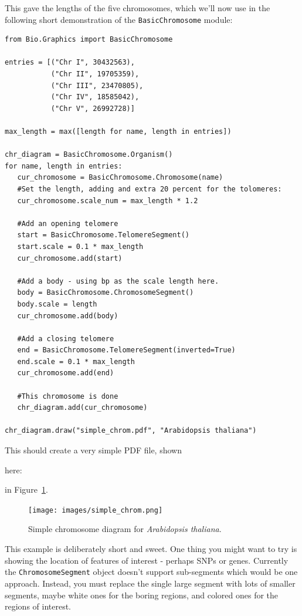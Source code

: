 \documentclass{report}
\begin{document}
\noindent This gave the lengths of the five chromosomes, which we'll now use in
the following short demonstration of the \verb|BasicChromosome| module:

\begin{verbatim}
from Bio.Graphics import BasicChromosome

entries = [("Chr I", 30432563),
           ("Chr II", 19705359),
           ("Chr III", 23470805),
           ("Chr IV", 18585042),
           ("Chr V", 26992728)]

max_length = max([length for name, length in entries])
          
chr_diagram = BasicChromosome.Organism()
for name, length in entries:
   cur_chromosome = BasicChromosome.Chromosome(name)
   #Set the length, adding and extra 20 percent for the tolomeres:
   cur_chromosome.scale_num = max_length * 1.2
   
   #Add an opening telomere
   start = BasicChromosome.TelomereSegment()
   start.scale = 0.1 * max_length
   cur_chromosome.add(start)

   #Add a body - using bp as the scale length here.
   body = BasicChromosome.ChromosomeSegment()
   body.scale = length
   cur_chromosome.add(body)

   #Add a closing telomere
   end = BasicChromosome.TelomereSegment(inverted=True)
   end.scale = 0.1 * max_length
   cur_chromosome.add(end)

   #This chromosome is done
   chr_diagram.add(cur_chromosome)

chr_diagram.draw("simple_chrom.pdf", "Arabidopsis thaliana")
\end{verbatim}

This should create a very simple PDF file, shown
\begin{htmlonly}
here:


\end{htmlonly}
\begin{latexonly}
in Figure~\ref{fig:simplechromosome}.
\begin{figure}[htbp]
\centering
\texttt{[image: images/simple\_chrom.png]}
\caption{Simple chromosome diagram for \textit{Arabidopsis thaliana}.}
\label{fig:simplechromosome}
\end{figure}
\end{latexonly}
This example is deliberately short and sweet. One thing you might want to try is
showing the location of features of interest - perhaps SNPs or genes.  Currently
the \verb|ChromosomeSegment| object doesn't support sub-segments which would be
one approach.  Instead, you must replace the single large segment with lots of
smaller segments, maybe white ones for the boring regions, and colored ones for
the regions of interest.
\end{document}
